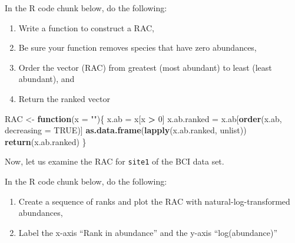 \documentclass[
]{article}
\newenvironment{Shaded}{\begin{snugshade}}{\end{snugshade}}
\newcommand{\AttributeTok}[1]{\textcolor[rgb]{0.13,0.29,0.53}{#1}}
\newcommand{\ConstantTok}[1]{\textcolor[rgb]{0.56,0.35,0.01}{#1}}
\newcommand{\ControlFlowTok}[1]{\textcolor[rgb]{0.13,0.29,0.53}{\textbf{#1}}}
\newcommand{\DecValTok}[1]{\textcolor[rgb]{0.00,0.00,0.81}{#1}}
\newcommand{\FunctionTok}[1]{\textcolor[rgb]{0.13,0.29,0.53}{\textbf{#1}}}
\newcommand{\NormalTok}[1]{#1}
\newcommand{\OtherTok}[1]{\textcolor[rgb]{0.56,0.35,0.01}{#1}}
\newcommand{\SpecialCharTok}[1]{\textcolor[rgb]{0.81,0.36,0.00}{\textbf{#1}}}
\newcommand{\StringTok}[1]{\textcolor[rgb]{0.31,0.60,0.02}{#1}}
\begin{document}
In the R code chunk below, do the following:

\begin{enumerate}
\def\labelenumi{\arabic{enumi}.}
\item
  Write a function to construct a RAC,
\item
  Be sure your function removes species that have zero abundances,
\item
  Order the vector (RAC) from greatest (most abundant) to least (least
  abundant), and
\item
  Return the ranked vector
\end{enumerate}

\begin{Shaded}
\begin{Highlighting}[]
\NormalTok{RAC }\OtherTok{\textless{}{-}} \ControlFlowTok{function}\NormalTok{(}\AttributeTok{x =} \StringTok{""}\NormalTok{)\{}
\NormalTok{  x.ab }\OtherTok{=}\NormalTok{ x[x }\SpecialCharTok{\textgreater{}} \DecValTok{0}\NormalTok{]}
\NormalTok{  x.ab.ranked }\OtherTok{=}\NormalTok{ x.ab[}\FunctionTok{order}\NormalTok{(x.ab, }\AttributeTok{decreasing =} \ConstantTok{TRUE}\NormalTok{)]}
  \FunctionTok{as.data.frame}\NormalTok{(}\FunctionTok{lapply}\NormalTok{(x.ab.ranked, unlist))}
  \FunctionTok{return}\NormalTok{(x.ab.ranked)}
\NormalTok{\}}
\end{Highlighting}
\end{Shaded}

Now, let us examine the RAC for \texttt{site1} of the BCI data set.

In the R code chunk below, do the following:

\begin{enumerate}
\def\labelenumi{\arabic{enumi}.}
\item
  Create a sequence of ranks and plot the RAC with
  natural-log-transformed abundances,
\item
  Label the x-axis ``Rank in abundance'' and the y-axis
  ``log(abundance)''
\end{enumerate}
\end{document}
